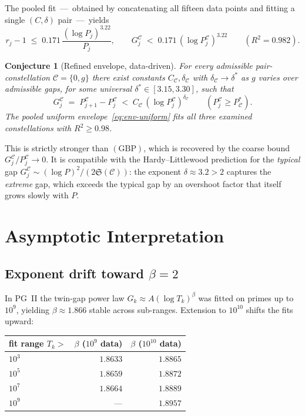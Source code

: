 \documentclass[11pt]{article}
\newtheorem{conjecture}[theorem]{Conjecture}
\begin{document}
The pooled fit~---~obtained by concatenating all fifteen data
points and fitting a single $(C,\delta)$ pair~---~yields
\begin{equation}\label{eq:env-uniform}
r_j-1 \;\le\; 0.171\,\frac{(\log P_j)^{3.22}}{P_j},
\qquad
G^{\mathcal{C}}_j \;<\; 0.171\,(\log P^{\mathcal{C}}_j)^{3.22}
\qquad(R^2=0.982).
\end{equation}

\begin{conjecture}[Refined envelope, data-driven]\label{conj:env}
For every admissible pair-constellation $\mathcal{C}=\{0,g\}$ there
exist constants $C_\mathcal{C},\delta_\mathcal{C}$ with
$\delta_\mathcal{C}\to\delta^*$ as $g$ varies over admissible gaps,
for some universal $\delta^*\in[3.15,3.30]$, such that
\[
G^\mathcal{C}_j \;=\; P^{\mathcal{C}}_{j+1}-P^{\mathcal{C}}_j
\;<\; C_\mathcal{C}\,(\log P^{\mathcal{C}}_j)^{\delta_\mathcal{C}}
\qquad(P^{\mathcal{C}}_j\ge P^{*}_\mathcal{C}).
\]
The pooled uniform envelope~\eqref{eq:env-uniform} fits all three
examined constellations with $R^2\ge 0.98$.
\end{conjecture}

This is strictly stronger than $(\mathrm{GBP})$, which is recovered
by the coarse bound $G^\mathcal{C}_j/P^{\mathcal{C}}_j\to 0$. It is
compatible with the Hardy--Littlewood prediction for the
\emph{typical} gap $G^\mathcal{C}_j\sim(\log P)^2/(2\mathfrak{S}(\mathcal{C}))$:
the exponent $\delta\approx 3.2>2$ captures the \emph{extreme} gap,
which exceeds the typical gap by an overshoot factor that itself
grows slowly with $P$.

\section{Asymptotic Interpretation}\label{sec:asymp}

\subsection{Exponent drift toward $\beta=2$}

In PG~II the twin-gap power law $G_k\approx A(\log T_k)^\beta$ was
fitted on primes up to $10^9$, yielding $\beta\approx 1.866$ stable
across sub-ranges. Extension to $10^{10}$ shifts the fits upward:

\begin{center}
\begin{tabular}{lrr}
\toprule
fit range $T_k>$ & $\beta$ ($10^9$ data) & $\beta$ ($10^{10}$ data) \\
\midrule
$10^3$ & $1.8633$ & $1.8865$ \\
$10^5$ & $1.8659$ & $1.8872$ \\
$10^7$ & $1.8664$ & $1.8889$ \\
$10^9$ & ---      & $1.8957$ \\
\bottomrule
\end{tabular}
\end{center}
\end{document}
